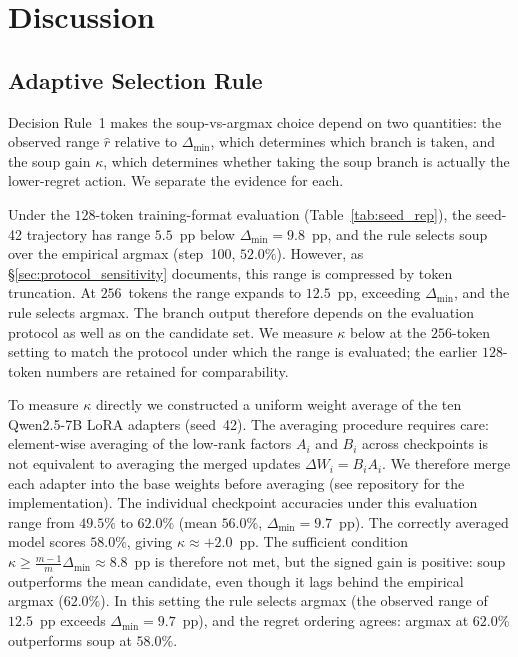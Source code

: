 \documentclass[pdflatex,sn-mathphys-ay,iicol]{sn-jnl}
\theoremstyle{thmstylethree}
\begin{document}
\begin{table}[t]
\section{Discussion}\label{sec:discussion}

\subsection{Adaptive Selection Rule}\label{sec:adaptive}

Decision Rule~1 makes the soup-vs-argmax choice depend on two quantities: the observed range $\hat r$ relative to $\Delta_{\min}$, which determines which branch is taken, and the soup gain $\kappa$, which determines whether taking the soup branch is actually the lower-regret action. We separate the evidence for each.

Under the $128$-token training-format evaluation (Table~\ref{tab:seed_rep}), the seed-42 trajectory has range $5.5$~pp below $\Delta_{\min}=9.8$~pp, and the rule selects soup over the empirical argmax (step~100, $52.0\%$). However, as \S\ref{sec:protocol_sensitivity} documents, this range is compressed by token truncation. At $256$~tokens the range expands to $12.5$~pp, exceeding $\Delta_{\min}$, and the rule selects argmax. The branch output therefore depends on the evaluation protocol as well as on the candidate set. We measure $\kappa$ below at the $256$-token setting to match the protocol under which the range is evaluated; the earlier $128$-token numbers are retained for comparability.

To measure $\kappa$ directly we constructed a uniform weight average of the ten Qwen2.5-7B LoRA adapters (seed~42). The averaging procedure requires care: element-wise averaging of the low-rank factors $A_i$ and $B_i$ across checkpoints is not equivalent to averaging the merged updates $\Delta W_i = B_iA_i$. We therefore merge each adapter into the base weights before averaging (see repository for the implementation). The individual checkpoint accuracies under this evaluation range from $49.5\%$ to $62.0\%$ (mean $56.0\%$, $\Delta_{\min}=9.7$~pp). The correctly averaged model scores $58.0\%$, giving $\kappa \approx +2.0$~pp. The sufficient condition $\kappa \geq \frac{m-1}{m}\Delta_{\min} \approx 8.8$~pp is therefore not met, but the signed gain is positive: soup outperforms the mean candidate, even though it lags behind the empirical argmax ($62.0\%$). In this setting the rule selects argmax (the observed range of $12.5$~pp exceeds $\Delta_{\min}=9.7$~pp), and the regret ordering agrees: argmax at $62.0\%$ outperforms soup at $58.0\%$.


\end{table}
\end{document}
